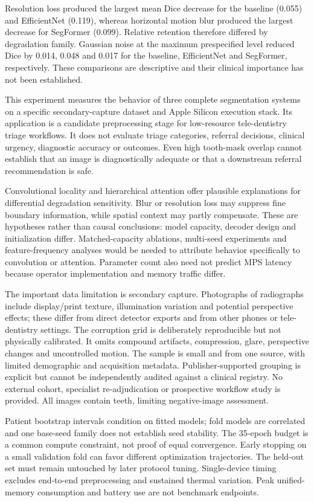 \documentclass[11pt]{article}
\begin{document}
Resolution loss produced the largest mean Dice decrease for the baseline (0.055) and EfficientNet (0.119), whereas horizontal motion blur produced the largest decrease for SegFormer (0.099). Relative retention therefore differed by degradation family. Gaussian noise at the maximum prespecified level reduced Dice by 0.014, 0.048 and 0.017 for the baseline, EfficientNet and SegFormer, respectively. These comparisons are descriptive and their clinical importance has not been established.

This experiment measures the behavior of three complete segmentation systems on a specific secondary-capture dataset and Apple Silicon execution stack. Its application is a candidate preprocessing stage for low-resource tele-dentistry triage workflows. It does not evaluate triage categories, referral decisions, clinical urgency, diagnostic accuracy or outcomes. Even high tooth-mask overlap cannot establish that an image is diagnostically adequate or that a downstream referral recommendation is safe.

Convolutional locality and hierarchical attention offer plausible explanations for differential degradation sensitivity. Blur or resolution loss may suppress fine boundary information, while spatial context may partly compensate. These are hypotheses rather than causal conclusions: model capacity, decoder design and initialization differ. Matched-capacity ablations, multi-seed experiments and feature-frequency analyses would be needed to attribute behavior specifically to convolution or attention. Parameter count also need not predict MPS latency because operator implementation and memory traffic differ.

The important data limitation is secondary capture. Photographs of radiographs include display/print texture, illumination variation and potential perspective effects; these differ from direct detector exports and from other phones or tele-dentistry settings. The corruption grid is deliberately reproducible but not physically calibrated. It omits compound artifacts, compression, glare, perspective changes and uncontrolled motion. The sample is small and from one source, with limited demographic and acquisition metadata. Publisher-supported grouping is explicit but cannot be independently audited against a clinical registry. No external cohort, specialist re-adjudication or prospective workflow study is provided. All images contain teeth, limiting negative-image assessment.

Patient bootstrap intervals condition on fitted models; fold models are correlated and one base-seed family does not establish seed stability. The 35-epoch budget is a common compute constraint, not proof of equal convergence. Early stopping on a small validation fold can favor different optimization trajectories. The held-out set must remain untouched by later protocol tuning. Single-device timing excludes end-to-end preprocessing and sustained thermal variation. Peak unified-memory consumption and battery use are not benchmark endpoints.
\end{document}
